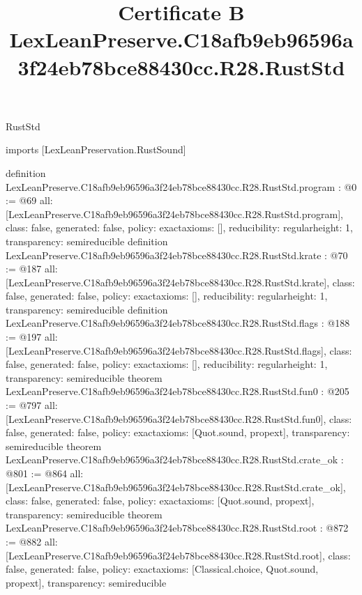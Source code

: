 \begin{lexlean}{RustStd}
\title{Certificate B LexLeanPreserve.C18afb9eb96596a3f24eb78bce88430cc.R28.RustStd}
\begin{coremodule}
imports [LexLeanPreservation.RustSound]

definition LexLeanPreserve.C18afb9eb96596a3f24eb78bce88430cc.R28.RustStd.program : @0 := @69 {
  all: [LexLeanPreserve.C18afb9eb96596a3f24eb78bce88430cc.R28.RustStd.program],
  class: false,
  generated: false,
  policy: exact{axioms: []},
  reducibility: regular{height: 1},
  transparency: semireducible
}
definition LexLeanPreserve.C18afb9eb96596a3f24eb78bce88430cc.R28.RustStd.krate : @70 := @187 {
  all: [LexLeanPreserve.C18afb9eb96596a3f24eb78bce88430cc.R28.RustStd.krate],
  class: false,
  generated: false,
  policy: exact{axioms: []},
  reducibility: regular{height: 1},
  transparency: semireducible
}
definition LexLeanPreserve.C18afb9eb96596a3f24eb78bce88430cc.R28.RustStd.flags : @188 := @197 {
  all: [LexLeanPreserve.C18afb9eb96596a3f24eb78bce88430cc.R28.RustStd.flags],
  class: false,
  generated: false,
  policy: exact{axioms: []},
  reducibility: regular{height: 1},
  transparency: semireducible
}
theorem LexLeanPreserve.C18afb9eb96596a3f24eb78bce88430cc.R28.RustStd.fun0 : @205 := @797 {
  all: [LexLeanPreserve.C18afb9eb96596a3f24eb78bce88430cc.R28.RustStd.fun0],
  class: false,
  generated: false,
  policy: exact{axioms: [Quot.sound, propext]},
  transparency: semireducible
}
theorem LexLeanPreserve.C18afb9eb96596a3f24eb78bce88430cc.R28.RustStd.crate_ok : @801 := @864 {
  all: [LexLeanPreserve.C18afb9eb96596a3f24eb78bce88430cc.R28.RustStd.crate_ok],
  class: false,
  generated: false,
  policy: exact{axioms: [Quot.sound, propext]},
  transparency: semireducible
}
theorem LexLeanPreserve.C18afb9eb96596a3f24eb78bce88430cc.R28.RustStd.root : @872 := @882 {
  all: [LexLeanPreserve.C18afb9eb96596a3f24eb78bce88430cc.R28.RustStd.root],
  class: false,
  generated: false,
  policy: exact{axioms: [Classical.choice, Quot.sound, propext]},
  transparency: semireducible
}


\end{coremodule}
\end{lexlean}
